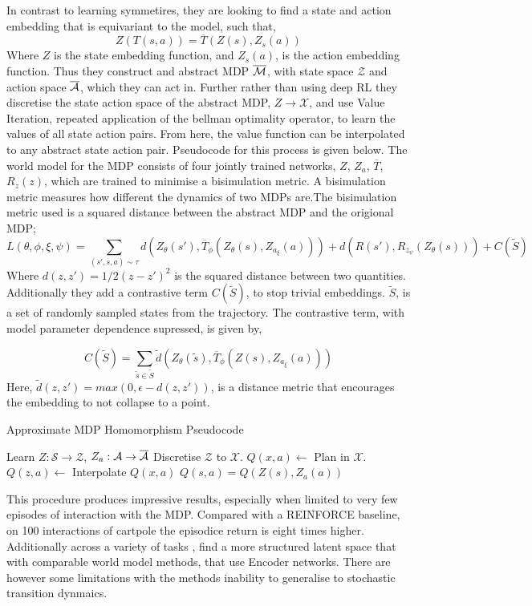 In contrast to learning symmetires, they are looking to find a state and action embedding that is equivariant to the model, such that,
\begin{equation}
	Z(T(s, a)) = \overline{T}(Z(s), Z_s(a))
\end{equation}
Where $Z$ is the state embedding function, and $Z_s(a)$, is the action embedding function. Thus they construct and abstract MDP $\overline{\mathcal{M}}$, with state space $\mathcal{Z}$ and action space $\overline{\mathcal{A}}$, which they can act in. Further rather than using deep RL they discretise the state action space of the abstract MDP, $Z \rightarrow \mathcal{X}$, and use Value Iteration, repeated application of the bellman optimality operator, to learn the values of all state action pairs. From here, the value function can be interpolated to any abstract state action pair. Pseudocode for this process is given below. The world model for the MDP consists of four jointly trained networks, $Z$, $Z_a$, $\overline{T}$, $R_z(z)$, which are trained to minimise a bisimulation metric. A bisimulation metric measures how different the dynamics of two MDPs are.The bisimulation metric used is a squared distance between the abstract MDP and the origional MDP;
\begin{equation}
	L(\theta, \phi, \xi, \psi) = \sum_{(s', s, a) \sim \tau} d(Z_\theta (s'), \overline{T}_\phi(Z_\theta(s), Z_{a_\xi}(a))) +  d(R(s'), R_{z_\psi}(Z_\theta (s))) + C(\tilde{S})
\end{equation}
Where $d(z, z') = 1/2 (z - z')^2$ is the squared distance between two quantities. Additionally they add a contrastive term $C(\tilde{S})$, to stop trivial embeddings. $\tilde{S}$, is a set of randomly sampled states from the trajectory. The contrastive term, with model parameter dependence supressed, is given by,

\begin{equation}
	C(\tilde{S}) = \sum_{\tilde{s} \in \tilde{S}} \tilde{d}(Z_\theta(\tilde{s}), \overline{T}_\phi(Z(s), Z_{a_\xi}(a)))
\end{equation}
Here, $\tilde{d}(z, z') = max(0, \epsilon - d(z, z'))$, is a distance metric that encourages the embedding to not collapse to a point.
\begin{algorithm}
	\caption{Approximate MDP Homomorphism Pseudocode}
	\begin{algorithmic}
		\State Learn $Z: \mathcal{S} \rightarrow \mathcal{Z}$, $Z_a: \mathcal{A} \rightarrow \overline{\mathcal{A}}$
		\State Discretise $\mathcal{Z}$ to $\mathcal{X}$.
		\State $Q(x, a) \leftarrow $ Plan in $\mathcal{X}$.
		\State $Q(z, a) \leftarrow$ Interpolate $Q(x, a)$
		\State $Q(s, a) = Q(Z(s), Z_a(a))$
	\end{algorithmic}
\end{algorithm}
This procedure produces impressive results, especially when limited to very few episodes of interaction with the MDP. Compared with a REINFORCE baseline, on 100 interactions of cartpole the episodice return is eight times higher. Additionally across a variety of tasks \cite{van2020plannable}, find a more structured latent space that with comparable world model methods, that use Encoder networks. There are however some limitations with the methods inability to generalise to stochastic transition dynmaics.


